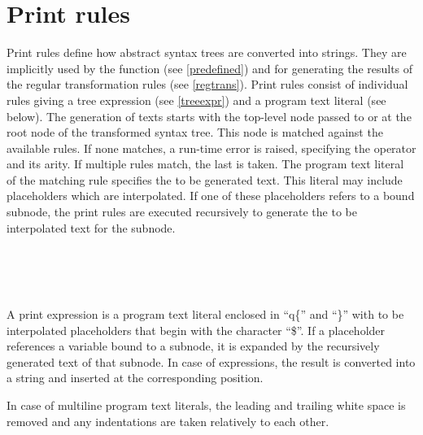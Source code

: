 \chapter{Print rules}\label{print}

Print rules define how abstract syntax trees are converted into
strings. They are implicitly used by the  function
(see \ref{predefined}) and for generating the results of the regular
transformation rules (see \ref{regtrans}). Print rules consist of
individual rules giving a tree expression (see \ref{treeexpr}) and a
program text literal (see below). The generation of texts starts with
the top-level node passed to  or at the root node of
the transformed syntax tree. This node is matched
against the available rules. If none matches, a run-time error is
raised, specifying the operator and its arity. If multiple rules
match, the last is taken. The program text literal of the matching
rule specifies the to be generated text. This literal may include
placeholders which are interpolated. If one of these placeholders refers
to a bound subnode, the print rules are executed recursively to generate
the to be interpolated text for the subnode.

\begin{grammar}
      \produces {} 
	 \lextoken{\{} 
	 \lextoken{\}} \\
      \produces {} \\
      \produces {}
	  \\
      \produces {}
	 \lextoken{->} 
\end{grammar}

\noindent
A print expression is a program text literal enclosed in ``q\{'' and
``\}'' with to be interpolated placeholders that begin with the character
``\$''.  If a placeholder references a variable bound to a subnode, it
is expanded by the recursively generated text of that subnode.  In case
of expressions, the result is converted into a string and inserted at
the corresponding position.

In case of multiline program text literals, the leading and trailing
white space is removed and any indentations are taken relatively to
each other.

